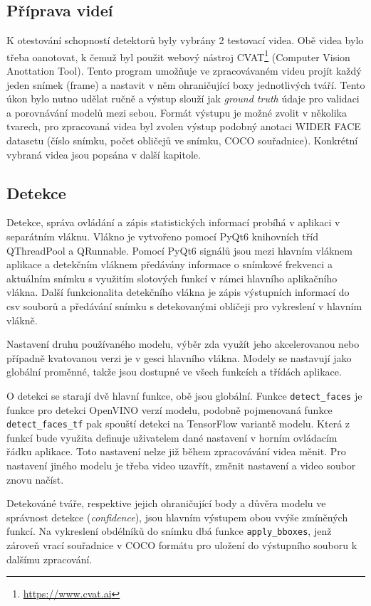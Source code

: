 \subsection*{Příprava videí}
K otestování schopností detektorů byly vybrány 2 testovací videa. Obě videa bylo třeba oanotovat, k čemuž byl použit webový nástroj CVAT\footnote{\url{https://www.cvat.ai}} (Computer Vision Anottation Tool). 
Tento program umožňuje ve zpracovávaném videu projít každý jeden snímek (frame) a nastavit v něm ohraničující boxy jednotlivých tváří. Tento úkon bylo nutno udělat ručně a výstup slouží jak \emph{ground truth} údaje pro validaci a porovnávání modelů mezi sebou. Formát výstupu je možné zvolit v několika tvarech, pro zpracovaná videa byl zvolen výstup podobný anotaci WIDER FACE datasetu (číslo snímku, počet obličejů ve snímku, COCO souřadnice). Konkrétní vybraná videa jsou popsána v další kapitole. 

\subsection*{Detekce}
Detekce, správa ovládání a zápis statistických informací probíhá v aplikaci v separátním vláknu. Vlákno je vytvořeno pomocí PyQt6 knihovních tříd QThreadPool a QRunnable. Pomocí PyQt6 signálů jsou mezi hlavním vláknem aplikace a detekčním vláknem předávány informace o snímkové frekvenci a aktuálním snímku s využitím slotových funkcí v rámci hlavního aplikačního vlákna. Další funkcionalita detekčního vlákna je zápis výstupních informací do csv souborů a předávání snímku s detekovanými obličeji pro vykreslení v hlavním vlákně.

Nastavení druhu používaného modelu, výběr zda využít jeho akcelerovanou nebo případně kvatovanou verzi je v gesci hlavního vlákna. Modely se nastavují jako globální proměnné, takže jsou dostupné ve všech funkcích a třídách aplikace.

O detekci se starají dvě hlavní funkce, obě jsou globální. Funkce \texttt{detect\_faces} je funkce pro detekci OpenVINO verzí modelu, podobně pojmenovaná funkce \texttt{detect\_faces\_tf} pak spouští detekci na TensorFlow variantě modelu. Která z funkcí bude využita definuje uživatelem dané nastavení v horním ovládacím řádku aplikace. Toto nastavení nelze již během zpracovávání videa měnit. Pro nastavení jiného modelu je třeba video uzavřít, změnit nastavení a video soubor znovu načíst.

Detekováné tváře, respektive jejich ohraničující body a důvěra modelu ve správnost detekce (\emph{confidence}), jsou hlavním výstupem obou vvýše zmíněných funkcí. Na vykreslení obdélníků do snímku dbá funkce \texttt{apply\_bboxes}, jenž zároveň vrací souřadnice v COCO formátu pro uložení do výstupního souboru k dalšímu zpracování.

